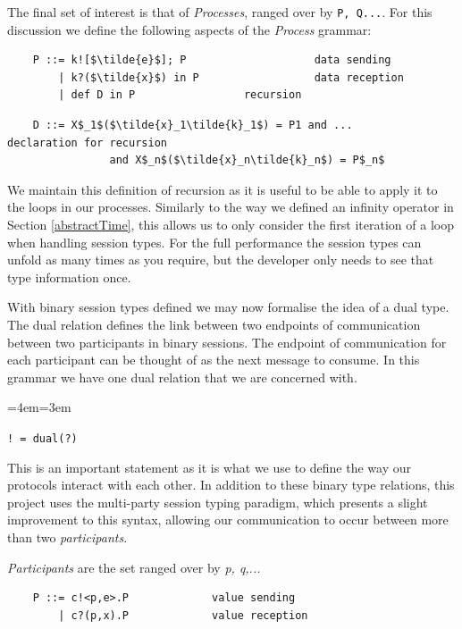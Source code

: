 \documentclass[11pt, abstracton, twoside, titlepage=true]{scrartcl}
\newenvironment{blockquote}{
	\par
	\medskip
	\leftskip=4em\rightskip=3em
	\noindent\ignorespaces
}{
	\par\medskip
}
\begin{document}
The final set of interest is that of \emph{Processes}, ranged over 
by \texttt{P, Q...}. For this discussion we define the following aspects 
of the \emph{Process} grammar:
\\
\begin{lstlisting}
    P ::= k![$\tilde{e}$]; P                    data sending
        | k?($\tilde{x}$) in P                  data reception
        | def D in P                 recursion
\end{lstlisting}
\begin{lstlisting}
    D ::= X$_1$($\tilde{x}_1\tilde{k}_1$) = P1 and ...           declaration for recursion
                and X$_n$($\tilde{x}_n\tilde{k}_n$) = P$_n$ 
\end{lstlisting}

We maintain this definition of recursion as it is useful to be able to apply it to 
the loops in our processes. Similarly to the way we defined an infinity operator in 
Section \ref{abstractTime}, this allows us to only consider the first iteration of a 
loop when handling session types. For the full performance the session types can 
unfold as many times as you require, but the developer only needs to see that 
type information once.

With binary session types defined we may now formalise the idea of a dual type. The 
dual relation defines the link between two endpoints of communication between two 
participants in binary sessions. The endpoint of communication for each participant 
can be thought of as the next message to consume. In this grammar we have one dual 
relation that we are concerned with. 

\begin{blockquote}
	\texttt{! = dual(?)}
\end{blockquote}

This is an important statement as it is what we use to define the way our protocols 
interact with each other. In addition to these binary type relations, this project 
uses the multi-party session typing paradigm, which presents a slight
improvement to this syntax, allowing our communication to occur between more
than two \emph{participants}. 

\emph{Participants} are the set ranged over by 
\emph{p, q,...}
\\
\begin{lstlisting}
    P ::= c!<p,e>.P             value sending
        | c?(p,x).P             value reception
\end{lstlisting}
\end{document}

